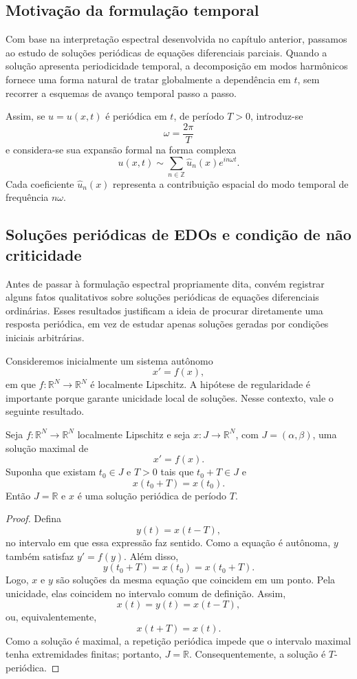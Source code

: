 \subsection{Motivação da formulação temporal}

Com base na interpretação espectral desenvolvida no capítulo anterior, passamos ao estudo de soluções periódicas de equações diferenciais parciais. Quando a solução apresenta periodicidade temporal, a decomposição em modos harmônicos fornece uma forma natural de tratar globalmente a dependência em \(t\), sem recorrer a esquemas de avanço temporal passo a passo.

Assim, se \(u=u(x,t)\) é periódica em \(t\), de período \(T>0\), introduz-se
\[
\omega=\frac{2\pi}{T}
\]
e considera-se sua expansão formal na forma complexa
\[
u(x,t)\sim \sum_{n\in\mathbb{Z}}\widehat{u}_n(x)e^{in\omega t}.
\]
Cada coeficiente \(\widehat{u}_n(x)\) representa a contribuição espacial do modo temporal de frequência \(n\omega\).


\subsection{Soluções periódicas de EDOs e condição de não criticidade}

Antes de passar à formulação espectral propriamente dita, convém registrar alguns fatos qualitativos sobre soluções periódicas de equações diferenciais ordinárias. Esses resultados justificam a ideia de procurar diretamente uma resposta periódica, em vez de estudar apenas soluções geradas por condições iniciais arbitrárias.

Consideremos inicialmente um sistema autônomo
\[
x'=f(x),
\]
em que \(f:\mathbb{R}^N\to\mathbb{R}^N\) é localmente Lipschitz. A hipótese de regularidade é importante porque garante unicidade local de soluções. Nesse contexto, vale o seguinte resultado.

\begin{teorema}
Seja \(f:\mathbb{R}^N\to\mathbb{R}^N\) localmente Lipschitz e seja \(x:J\to\mathbb{R}^N\), com \(J=(\alpha,\beta)\), uma solução maximal de
\[
x'=f(x).
\]
Suponha que existam \(t_0\in J\) e \(T>0\) tais que \(t_0+T\in J\) e
\[
x(t_0+T)=x(t_0).
\]
Então \(J=\mathbb{R}\) e \(x\) é uma solução periódica de período \(T\).
\end{teorema}

\begin{proof}
Defina
\[
y(t)=x(t-T),
\]
no intervalo em que essa expressão faz sentido. Como a equação é autônoma, \(y\) também satisfaz \(y'=f(y)\). Além disso,
\[
y(t_0+T)=x(t_0)=x(t_0+T).
\]
Logo, \(x\) e \(y\) são soluções da mesma equação que coincidem em um ponto. Pela unicidade, elas coincidem no intervalo comum de definição. Assim,
\[
x(t)=y(t)=x(t-T),
\]
ou, equivalentemente,
\[
x(t+T)=x(t).
\]
Como a solução é maximal, a repetição periódica impede que o intervalo maximal tenha extremidades finitas; portanto, \(J=\mathbb{R}\). Consequentemente, a solução é \(T\)-periódica.
\end{proof}

